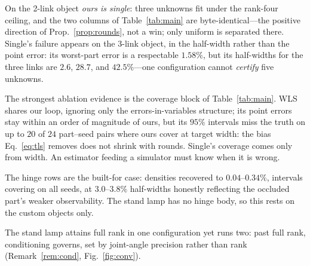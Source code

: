 On the 2-link
object \emph{ours is single}: three unknowns fit under the rank-four
ceiling, and the two columns of Table~\ref{tab:main} are
byte-identical---the positive direction of Prop.~\ref{prop:rounds}, not a
win; only uniform is separated there. Single's failure appears on the 3-link
object, in the half-width rather than the point error: its worst-part error
is a respectable $1.58\%$, but its half-widths for the three links are
$2.6$, $28.7$, and $42.5\%$---one configuration cannot \emph{certify} five
unknowns.

The strongest ablation evidence is the coverage block of
Table~\ref{tab:main}. WLS shares our loop, ignoring only the
errors-in-variables structure; its point errors stay within an order of
magnitude of ours, but its $95\%$ intervals miss the truth on up to $20$ of
$24$ part--seed pairs where ours cover at target width: the bias
Eq.~\eqref{eq:tls} removes does not shrink with rounds. Single's coverage
comes only from width. An estimator feeding a simulator must know when it
is wrong.

The hinge rows are the built-for case: densities recovered to $0.04$--$0.34\%$, intervals covering on all seeds, at
$3.0$--$3.8\%$ half-widths honestly reflecting the occluded part's weaker
observability. The stand lamp has no hinge body, so this rests on the custom
objects only.

The stand lamp attains full rank in one configuration yet runs two: past
full rank, conditioning governs, set by joint-angle precision rather than
rank (Remark~\ref{rem:cond}, Fig.~\ref{fig:conv}).

